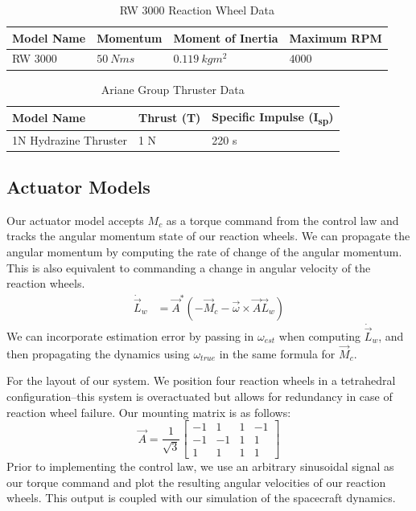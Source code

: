 \begin{table}[H]
\centering
\caption{RW 3000 Reaction Wheel Data \cite{RW3000Datasheet}}
\label{tab:reaction_wheel_data}
\begin{tabular}{|l|l|l|l|}
\hline
Model Name & Momentum     & Moment of Inertia    & Maximum RPM \\ \hline
RW 3000    & $\qty{50}{Nms}$   & $\qty{0.119}{kg m^2}$       & $4000$        \\ \hline
\end{tabular}
\end{table}

\begin{table}[H]
\centering
\caption{Ariane Group Thruster Data}
\label{tab:reaction_thruster}
\begin{tabular}{|l|l|l|}
\hline
Model Name              & Thrust (T)    & Specific Impulse (I\textsubscript{sp})\\ \hline
1N Hydrazine Thruster   & 1 N           & 220 s \\ \hline
\end{tabular}
\end{table}

\subsection{Actuator Models}
Our actuator model accepts $M_{c}$ as a torque command from the control law and tracks the angular momentum state of our reaction wheels. We can propagate the angular momentum by computing the rate of change of the angular momentum. This is also equivalent to commanding a change in angular velocity of the reaction wheels.
\begin{align*}
    \Dot{\Vec{L}}_{w} &= \Vec{A}^{*} (-\Vec{M}_{c} - \Vec{\omega} \times \Vec{A} \Vec{L}_{w})
\end{align*}
We can incorporate estimation error by passing in $\omega_{est}$ when computing $\Dot{\Vec{L}}_{w}$, and then propagating the dynamics using $\omega_{true}$ in the same formula for $\Vec{M}_{c}$.

For the layout of our system. We position four reaction wheels in a tetrahedral configuration–this system is overactuated but allows for redundancy in case of reaction wheel failure. Our mounting matrix is as follows:
\begin{equation*}
    \Vec{A} = \frac{1}{\sqrt{3}} \begin{bmatrix}
        -1 & 1 & 1 & -1 \\
        -1 & -1 & 1 & 1 \\
        1 & 1 & 1 & 1
    \end{bmatrix}
\end{equation*}
Prior to implementing the control law, we use an arbitrary sinusoidal signal as our torque command and plot the resulting angular velocities of our reaction wheels. This output is coupled with our simulation of the spacecraft dynamics.

